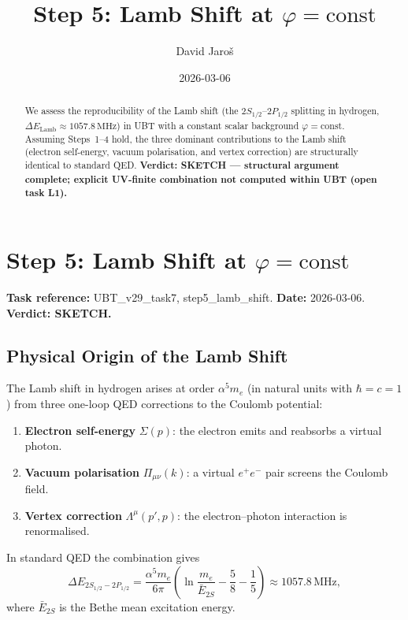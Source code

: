 \documentclass[12pt]{article}
\title{\textbf{Step 5: Lamb Shift at $\varphi = \mathrm{const}$}}
\author{David Jaroš}
\date{2026-03-06}
\theoremstyle{definition}
\theoremstyle{remark}
\begin{document}
  \maketitle

  \begin{abstract}
  We assess the reproducibility of the Lamb shift (the $2S_{1/2}$--$2P_{1/2}$ splitting
  in hydrogen, $\Delta E_\mathrm{Lamb}\approx 1057.8\,\mathrm{MHz}$) in UBT with a
  constant scalar background $\varphi = \mathrm{const}$.
  Assuming Steps~1--4 hold, the three dominant contributions to the Lamb shift
  (electron self-energy, vacuum polarisation, and vertex correction) are structurally
  identical to standard QED.
  \textbf{Verdict: SKETCH — structural argument complete; explicit UV-finite combination
  not computed within UBT (open task L1).}
  \end{abstract}
\fi

\section{Step 5: Lamb Shift at $\varphi = \mathrm{const}$}
\label{sec:lamb_shift}

\textbf{Task reference:} UBT\_v29\_task7, step5\_lamb\_shift.
\textbf{Date:} 2026-03-06.
\textbf{Verdict: SKETCH.}

\subsection{Physical Origin of the Lamb Shift}

The Lamb shift in hydrogen arises at order $\alpha^5 m_e$ (in natural units with
$\hbar = c = 1$) from three one-loop QED corrections to the Coulomb potential:
\begin{enumerate}
  \item \textbf{Electron self-energy} $\Sigma(p)$: the electron emits and reabsorbs a
        virtual photon.
  \item \textbf{Vacuum polarisation} $\Pi_{\mu\nu}(k)$: a virtual $e^+e^-$ pair
        screens the Coulomb field.
  \item \textbf{Vertex correction} $\Lambda^\mu(p',p)$: the electron--photon interaction
        is renormalised.
\end{enumerate}

In standard QED the combination gives
\begin{equation}
  \Delta E_{2S_{1/2}-2P_{1/2}}
  = \frac{\alpha^5 m_e}{6\pi}
    \left(\ln\frac{m_e}{\bar{E}_{2S}} - \frac{5}{8} - \frac{1}{5}\right)
  \approx 1057.8\,\mathrm{MHz},
\end{equation}
where $\bar{E}_{2S}$ is the Bethe mean excitation energy.
\end{document}
